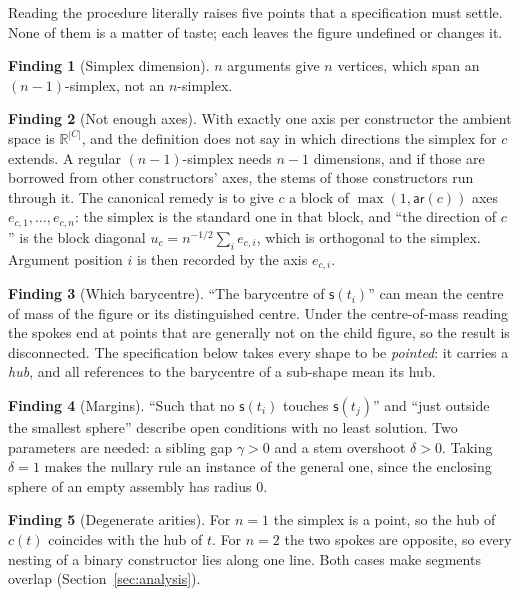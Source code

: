 \documentclass[11pt]{article}
\theoremstyle{definition}
\newtheorem{finding}{Finding}
\theoremstyle{remark}
\newcommand{\R}{\mathbb{R}}
\newcommand{\ar}{\mathsf{ar}}
\newcommand{\sh}{\mathsf{s}}
\begin{document}
Reading the procedure literally raises five points that a specification must
settle. None of them is a matter of taste; each leaves the figure undefined or
changes it.

\begin{finding}[Simplex dimension]
$n$ arguments give $n$ vertices, which span an $(n-1)$-simplex, not an
$n$-simplex.
\end{finding}

\begin{finding}[Not enough axes]
With exactly one axis per constructor the ambient space is $\R^{|C|}$, and the
definition does not say in which directions the simplex for $c$ extends. A
regular $(n-1)$-simplex needs $n-1$ dimensions, and if those are borrowed from
other constructors' axes, the stems of those constructors run through it. The
canonical remedy is to give $c$ a block of $\max(1,\ar(c))$ axes
$e_{c,1},\dots,e_{c,n}$: the simplex is the standard one in that block, and ``the
direction of $c$'' is the block diagonal $u_c = n^{-1/2}\sum_i e_{c,i}$, which is
orthogonal to the simplex. Argument position $i$ is then recorded by the axis
$e_{c,i}$.
\end{finding}

\begin{finding}[Which barycentre]
``The barycentre of $\sh(t_i)$'' can mean the centre of mass of the figure or its
distinguished centre. Under the centre-of-mass reading the spokes end at points
that are generally not on the child figure, so the result is disconnected. The
specification below takes every shape to be \emph{pointed}: it carries a
\emph{hub}, and all references to the barycentre of a sub-shape mean its hub.
\end{finding}

\begin{finding}[Margins]
``Such that no $\sh(t_i)$ touches $\sh(t_j)$'' and ``just outside the smallest
sphere'' describe open conditions with no least solution. Two parameters are
needed: a sibling gap $\gamma>0$ and a stem overshoot $\delta>0$. Taking
$\delta=1$ makes the nullary rule an instance of the general one, since the
enclosing sphere of an empty assembly has radius $0$.
\end{finding}

\begin{finding}[Degenerate arities]
For $n=1$ the simplex is a point, so the hub of $c(t)$ coincides with the hub of
$t$. For $n=2$ the two spokes are opposite, so every nesting of a binary
constructor lies along one line. Both cases make segments overlap
(Section~\ref{sec:analysis}).
\end{finding}
\end{document}
